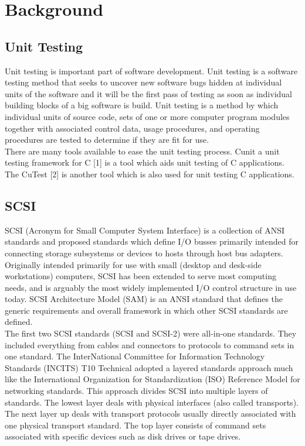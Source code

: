 
\section{Background}\vspace{3 mm}
\subsection{Unit Testing}
Unit testing is important part of software development. Unit testing is a software testing method that seeks to uncover new software bugs hidden at individual units of the software and it will be the first pass of testing as soon as individual building blocks of a big software is build.  Unit testing is a method by which individual units of source code, sets of one or more computer program modules together with associated control data, usage procedures, and operating procedures are tested to determine if they are fit for use.\\

There are many tools available to ease the unit testing process. Cunit a unit testing framework for C [1] is a tool which aids unit testing of C applications.  The CuTest [2] is another tool which is also used for unit testing C applications.\\

\subsection{SCSI}

SCSI (Acronym for Small Computer System Interface) is a collection of ANSI standards and proposed standards which define I/O busses primarily intended for connecting storage subsystems or devices to hosts through host bus adapters. Originally intended primarily for use with small (desktop and desk-side workstations) computers, SCSI has been extended to serve most computing needs, and is arguably the most widely implemented I/O control structure in use today.  SCSI Architecture Model (SAM) is an ANSI standard that defines the generic requirements and overall framework in which other SCSI standards are defined. \\

The first two SCSI standards (SCSI and SCSI-2) were all-in-one standards. They included everything from cables and connectors to protocols to command sets in one standard. The InterNational Committee for Information Technology Standards (INCITS) T10 Technical adopted a layered standards approach much like the International Organization for Standardization (ISO) Reference Model for networking standards. This approach divides SCSI into multiple layers of standards. The lowest layer deals with physical interfaces (also called transports). The next layer up deals with transport protocols usually directly associated with one physical transport standard. The top layer consists of command sets associated with specific devices such as disk drives or tape drives. \\

